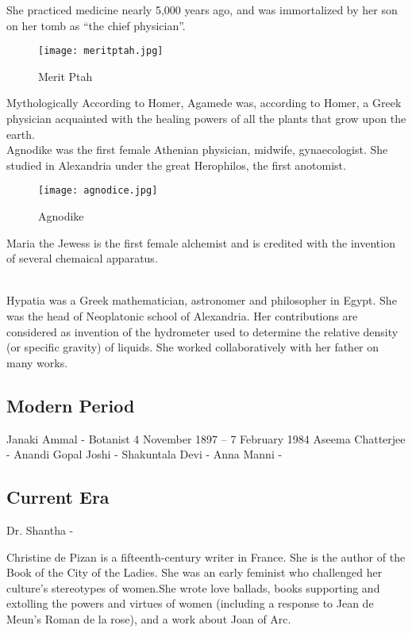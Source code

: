 \documentclass[a4paper,10pt]{article}
\begin{document}
She practiced medicine nearly 5,000 years ago, and was immortalized by her son on her tomb as “the chief physician”\cite{merit}.
\begin{center}
\begin{figure}[h]
\centering
 \texttt{[image: meritptah.jpg]}
 \caption{Merit Ptah}
\end{figure}
\end{center}

\newblock
Mythologically According to Homer, Agamede was, according to Homer, a Greek physician acquainted with the healing powers of all the plants that grow upon the earth.\\

\newblock
Agnodike was the first female Athenian physician, midwife, gynaecologist. She studied in Alexandria under the great Herophilos, the first anotomist.

\begin{center}
\begin{figure}[h]
\centering
 \texttt{[image: agnodice.jpg]}
 \caption{Agnodike}
\end{figure}
\end{center}

\newblock
Maria the Jewess is the first female alchemist and is credited with the invention of several chemaical apparatus.

\newblock
\\Hypatia was a Greek mathematician, astronomer and philosopher in Egypt. She was the head of Neoplatonic school of Alexandria. Her contributions are considered as invention of the hydrometer used to determine the relative density (or specific gravity) of liquids. She worked collaboratively with her father on many works.\\

\subsection{Modern Period}

Janaki Ammal - Botanist 4 November 1897 – 7 February 1984 \cite{janaki}
Aseema Chatterjee - \cite{chaterjee}
Anandi Gopal Joshi - \cite{joshi}
Shakuntala Devi - \cite{shakuntala}
Anna Manni - \cite{anna}
\subsection{Current Era}
Dr. Shantha - \cite{shantha}


\newblock
Christine de Pizan is a fifteenth-century writer in France. She is the author of the Book of the City of the Ladies. She was an early feminist who challenged her culture's stereotypes of women.She wrote love ballads, books supporting and extolling the powers and virtues of women (including a response to Jean de Meun's Roman de la rose), and a work about Joan of Arc.\cite{christine}\\
\end{document}
